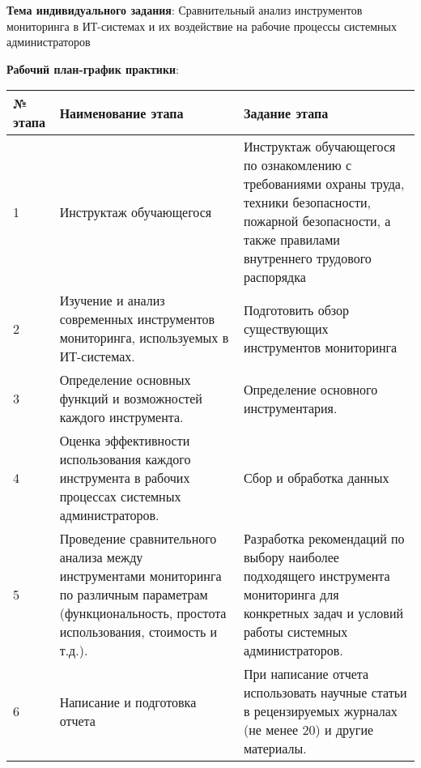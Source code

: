 
\textbf{Тема индивидуального задания}: 
Сравнительный анализ инструментов мониторинга в ИТ-системах и их воздействие на рабочие процессы системных администраторов

\textbf{Рабочий план-график практики}:

\begin{longtable}{|l|p{6cm}|p{6cm}|}
    \hline
    № этапа & Наименование этапа                                                                                                                                      & Задание этапа                                                                                                                                                        \\ \hline
    1       & Инструктаж обучающегося                                                                                                                                 & Инструктаж обучающегося по ознакомлению с требованиями охраны труда, техники безопасности, пожарной безопасности, а также правилами внутреннего трудового распорядка \\ \hline
    2       & Изучение и анализ современных инструментов мониторинга, используемых в ИТ-системах.                                                                     & Подготовить обзор существующих инструментов мониторинга                                                                                                              \\ \hline
    3       & Определение основных функций и возможностей каждого инструмента.                                                                                        & Определение основного инструментария.                                                                                                                                \\ \hline
    4       & Оценка эффективности использования каждого инструмента в рабочих процессах системных администраторов.                                                   & Сбор и обработка данных                                                                                                                                              \\ \hline
    5       & Проведение сравнительного анализа между инструментами мониторинга по различным параметрам (функциональность, простота использования, стоимость и т.д.). & Разработка рекомендаций по выбору наиболее подходящего инструмента мониторинга для конкретных задач и условий работы системных администраторов.                      \\ \hline
    6       & Написание и подготовка отчета                                                                                                                           & При написание отчета использовать научные статьи в рецензируемых журналах (не менее 20) и другие материалы.                                                          \\ \hline
\end{longtable}

